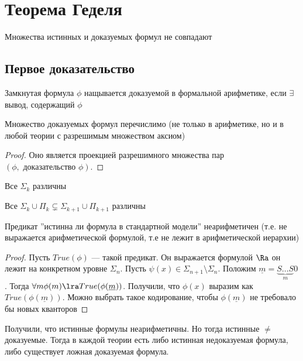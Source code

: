 \section{Теорема Геделя}
\begin{theorem}
    Множества истинных и доказуемых формул не совпадают
\end{theorem}
\subsection{Первое доказательство}
\begin{definition}
    Замкнутая формула \(\phi\) нащывается доказуемой в формальной арифметике, если \(\exists\) вывод, содержащий \(\phi\)
\end{definition}

\begin{proposition}
    Множество доказуемых формул перечислимо (не только в арифметике, но и в любой теории с разрешимым множеством аксиом)
\end{proposition}
\begin{proof}
    Оно является проекцией разрешимного множества пар \((\phi, \text{ доказательство }\phi)\).
\end{proof}

\begin{theorem}
    Все \(\Sigma_k\) различны
\end{theorem}

\begin{theorem}
    Все \(\Sigma_k \cup \Pi_k \subsetneq \Sigma_{k + 1} \cup \Pi_{k + 1}\) различны
\end{theorem}

\begin{theorem}[Тарского]
    Предикат ''истинна ли формула в стандартной модели'' неарифметичен (т.е. не выражается арифметической формулой, т.е не лежит в арифметической иерархии)
\end{theorem}
\begin{proof}
    Пусть \(True(\phi)\) --- такой предикат. Он выражается формулой \(\Ra\) он лежит на конкретном уровне \(\Sigma_n\). Пусть \(\psi(x) \in \Sigma_{n + 1} \setminus \Sigma_n\). Положим \(\underline{m} = \underbrace{S\dots S}_m0\). Тогда \(\forall m \phi(m) \lra True(\phi(\underline{m}))\). Получили, что \(\phi(x)\) выразим как \(True(\phi(\underline{m}))\). Можно выбрать такое кодирование, чтобы \(\phi(\underline{m})\) не требовало бы новых кванторов
\end{proof}
\begin{corollary}
    Получили, что истинные формулы неарифметичны. Но тогда истинные \(\ne\) доказуемые. Тогда в каждой теории есть либо истинная недоказуемая формула, либо существует ложная доказуемая формула.
\end{corollary}

